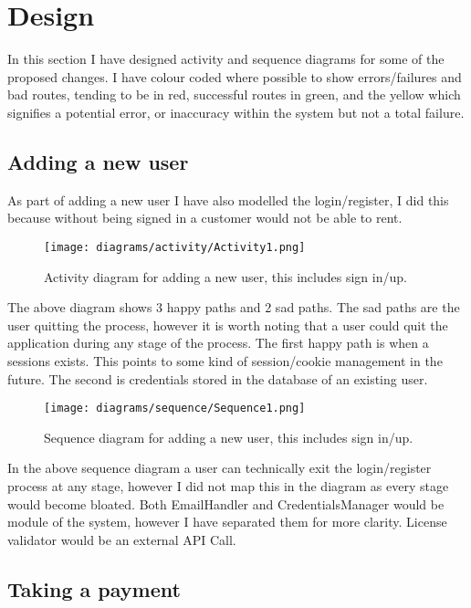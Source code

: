 \section{Design}
  In this section I have designed activity and sequence diagrams for some of the proposed changes. I have colour coded where possible to show
  errors/failures and bad routes, tending to be in red, successful routes in green, and the yellow which signifies a potential error, or
  inaccuracy within the system but not a total failure.

  \subsection{Adding a new user}
    As part of adding a new user I have also modelled the login/register, I did this because without being signed in a customer
    would not be able to rent.

    \begin{figure}[H]
      \centering
      \texttt{[image: diagrams/activity/Activity1.png]}
      \caption{Activity diagram for adding a new user, this includes sign in/up.}
      \label{fig:newUserActivity}
    \end{figure}

    The above diagram shows 3 happy paths and 2 sad paths. The sad paths are the user quitting the process, however it is worth
    noting that a user could quit the application during any stage of the process. The first happy path is when a sessions exists.
    This points to some kind of session/cookie management in the future. The second is credentials stored in the database of an 
    existing user.

    \begin{figure}[H]
      \centering
      \texttt{[image: diagrams/sequence/Sequence1.png]}
      \caption{Sequence diagram for adding a new user, this includes sign in/up.}
      \label{fig:newUserSequence}
    \end{figure}

    In the above sequence diagram a user can technically exit the login/register process at any stage, however I did not map this in the 
    diagram as every stage would become bloated. Both EmailHandler and CredentialsManager would be module of
    the system, however I have separated them for more clarity. License validator would be an external API Call. 
  
  \newpage
  
  \subsection{Taking a payment}

